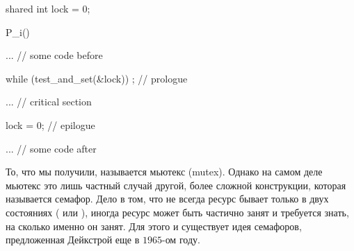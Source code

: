 \begin{ccode}
  shared int lock = 0;

  P_i() {
    ... // some code before

    while (test_and_set(&lock)) {}; // prologue

    ... // critical section

    lock = 0; // epilogue

    ... // some code after
  }
\end{ccode}

То, что мы получили, называется мьютекс (mutex). Однако на самом деле мьютекс
это лишь частный случай другой, более сложной конструкции, которая называется
семафор. Дело в том, что не всегда ресурс бывает только в двух состояниях
( или ), иногда ресурс может быть частично
занят и требуется знать, на сколько именно он занят. Для этого и существует идея
семафоров, предложенная Дейкстрой еще в \(1965\)-ом году.
